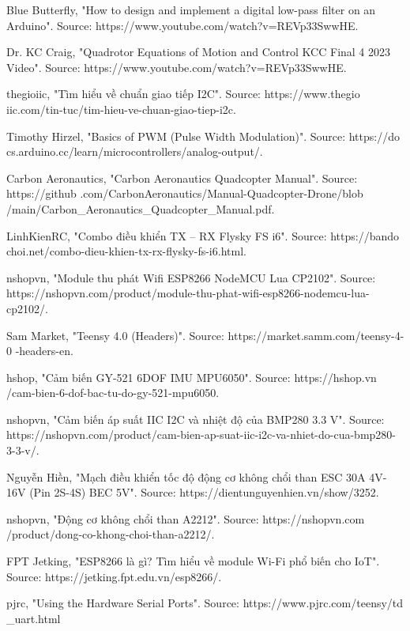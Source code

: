 \begin{thebibliography}{99}
 Blue Butterfly, "How to design and implement a digital low-pass filter on an Arduino". Source: https://www.youtube.com/watch?v=REVp33SwwHE.

 Dr. KC Craig, "Quadrotor Equations of Motion and Control KCC Final 4 2023 Video". Source: https://www.youtube.com/watch?v=REVp33SwwHE.

 thegioiic, "Tìm hiểu về chuẩn giao tiếp I2C". Source: https://www.thegio iic.com/tin-tuc/tim-hieu-ve-chuan-giao-tiep-i2c.

 Timothy Hirzel, "Basics of PWM (Pulse Width Modulation)". Source: https://do cs.arduino.cc/learn/microcontrollers/analog-output/.

 Carbon Aeronautics, "Carbon Aeronautics Quadcopter Manual". Source: https://github .com/CarbonAeronautics/Manual-Quadcopter-Drone/blob /main/Carbon\_Aeronautics\_Quadcopter\_Manual.pdf.

 LinhKienRC, "Combo điều khiển TX – RX Flysky FS i6". Source: https://bando choi.net/combo-dieu-khien-tx-rx-flysky-fs-i6.html.

 nshopvn, "Module thu phát Wifi ESP8266 NodeMCU Lua CP2102". Source: https://nshopvn.com/product/module-thu-phat-wifi-esp8266-nodemcu-lua-cp2102/.

 Sam Market, "Teensy 4.0 (Headers)". Source: https://market.samm.com/teensy-4-0 -headers-en.

 hshop, "Cảm biến GY-521 6DOF IMU MPU6050". Source: https://hshop.vn /cam-bien-6-dof-bac-tu-do-gy-521-mpu6050.

 nshopvn, "Cảm biến áp suất IIC I2C và nhiệt độ của BMP280 3.3 V". Source: https://nshopvn.com/product/cam-bien-ap-suat-iic-i2c-va-nhiet-do-cua-bmp280-3-3-v/.

 Nguyễn Hiền, "Mạch điều khiển tốc độ động cơ không chổi than ESC 30A 4V-16V (Pin 2S-4S) BEC 5V". Source: https://dientunguyenhien.vn/show/3252.

 nshopvn, "Động cơ không chổi than A2212". Source: https://nshopvn.com /product/dong-co-khong-choi-than-a2212/.

 FPT Jetking, "ESP8266 là gì? Tìm hiểu về module Wi-Fi phổ biến cho IoT". Source: https://jetking.fpt.edu.vn/esp8266/.

 pjrc, "Using the Hardware Serial Ports". Source: https://www.pjrc.com/teensy/td \_uart.html


\end{thebibliography}
